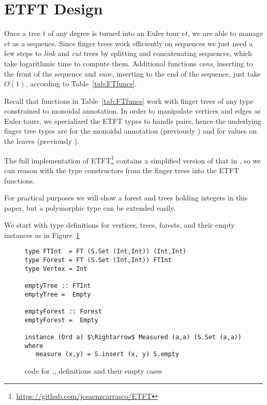 \section{ETFT Design}
\label{sec:TechDes}  

Once a tree $t$ of any degree is turned into an Euler tour $et$, we are able to manage $et$ as a sequence. Since finger trees work efficiently on sequences we just need a few steps to \textit{link} and \textit{cut} trees by splitting and concatenating sequences, which take logarithmic time to compute them. Additional functions \textit{cons}, inserting to the front of the sequence and \textit{snoc}, inserting to the end of the sequence, just take $O(1)$, according to Table~\ref{tab:FTfuncs}.

Recall that functions in Table~\ref{tab:FTfuncs} work with finger trees of any type  constrained to  monoidal annotation. In order to manipulate vertices and edges as Euler tours, we specialized the ETFT types to handle  pairs, hence the underlying finger tree types are  for the monoidal annotation (previously ) and  for values on the leaves (previously ). 

The full implementation of ETFT\footnote{\url{https://github.com/jcsaenzcarrasco/ETFT}} contains a simplified version of that in \cite{HaskellFT}, so we can reason with the type constructors from the finger trees into the ETFT functions. 


For practical purposes we will show a forest and trees holding integers in this paper, but a polymorphic type can be extended easily.

We start with type definitions for vertices, trees, forests, and their empty instances as in Figure~\ref{fig:emptys}
\begin{figure}
\begin{lstlisting}[mathescape]
type FTInt  = FT (S.Set (Int,Int)) (Int,Int) 
type Forest = FT (S.Set (Int,Int)) FTInt 
type Vertex = Int 

emptyTree :: FTInt
emptyTree =  Empty 

emptyForest :: Forest
emptyForest =  Empty

instance (Ord a) $\Rightarrow$ Measured (a,a) (S.Set (a,a)) where 
   measure (x,y) = S.insert (x, y) S.empty 
\end{lstlisting}   
\caption{code for ,, definitions and their empty cases}
\label{fig:emptys}
\end{figure}

